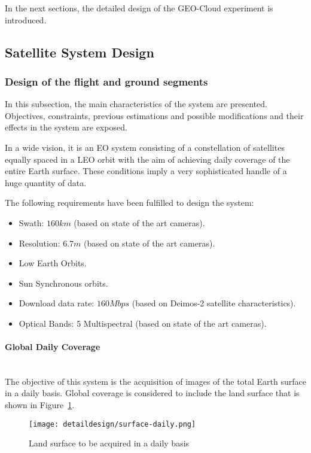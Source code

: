 In the next sections, the detailed design of the GEO-Cloud experiment is introduced.

\subsection{Satellite System Design}
\label{subsec:system-design}
\subsubsection{Design of the flight and ground segments}
\label{subsubsec:design-flight-ground}
In this subsection, the main characteristics of the system are presented. Objectives, constraints, previous estimations and possible modifications and their effects in the system are exposed.

In a wide vision, it is an \acs{EO} system consisting of a constellation of satellites equally spaced in a \acs{LEO} orbit with the aim of achieving daily coverage of the entire Earth surface. These conditions imply a very sophisticated handle of a huge quantity of data.

The following requirements have been fulfilled to design the system:
\begin{itemize}
\item Swath: $160km$ (based on state of the art cameras).
\item Resolution: $6.7m$ (based on state of the art cameras).
\item Low Earth Orbits.
\item Sun Synchronous orbits.
\item Download data rate: $160 Mbps$ (based on Deimos-2 satellite characteristics).
\item Optical Bands: 5 Multispectral (based on state of the art cameras).
\end{itemize}

\paragraph{Global Daily Coverage}~\\
The objective of this system is the acquisition of images of the total Earth surface in a daily basis. Global coverage is considered to include the land surface that is shown in Figure~\ref{fig:intr-land-surface}.


\begin{figure}[!h]
\begin{center}
\texttt{[image: detaildesign/surface-daily.png]}
\caption{Land surface to be acquired in a daily basis}
\label{fig:intr-land-surface}
\end{center}
\end{figure}


